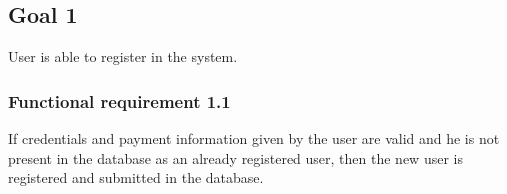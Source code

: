 \subsection{Goal 1}
User is able to register in the system.

\setcounter{secnumdepth}{3}
\subsubsection{Functional requirement 1.1}
If credentials and payment information given by the user are valid and he is not present in the database as an already registered user, then the new user is registered and submitted in the database.
